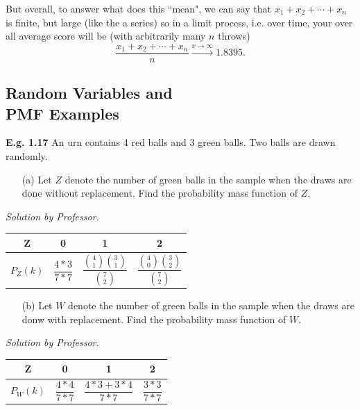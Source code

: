 \documentclass[12pt]{book}
\begin{document}
But overall, to answer what does this ``mean", we can say that 
$x_{1}+x_{2}+\cdots+x_{n}$ is finite, but large (like the a series)
so in a limit process, i.e. over time, your over all average score will be (with arbitrarily many $n$ throws)
$$\frac{x_{1}+x_{2}+\cdots+x_{n}}{n} \xrightarrow{x\to \infty} 1.8395.$$











\subsection{Random Variables and \\PMF Examples}
\noindent \textbf{E.g. 1.17} An urn contains 4 red balls and 3 green balls. Two balls are drawn randomly. 
\begin{itemize} \item [(a)] Let $Z$ denote the number of green balls in the sample when the draws are done without replacement. Find the probability mass function of $Z$.\end{itemize}
\textit{Solution by Professor.}\\
\begin{center}
\begin{tabular}{|c|c|c|c|}
\hline
	Z & 0 & 1 & 2\\
\hline
	$P_{Z}(k)$ & $\dfrac{4*3}{7*7}$ & $\dfrac{{4\choose1}{3\choose1}}{{7\choose2}}$ & $\dfrac{{4\choose0}{3\choose2}}{{7\choose2}}$ \\
\hline
\end{tabular}
\end{center}

\begin{itemize} \item [(b)] Let $W$ denote the number of green balls in the sample when the draws are donw with replacement. Find the probability mass function of $W$. \end{itemize}
\textit{Solution by Professor.}\\
\begin{center}
\begin{tabular}{|c|c|c|c|}
\hline
	Z & 0 & 1 & 2\\
\hline
	$P_{W}(k)$ & $\dfrac{4*4}{7*7}$ & $\dfrac{4*3+3*4}{7*7}$ & $\dfrac{3*3}{7*7}$ \\
\hline
\end{tabular}
\end{center}
\end{document}
